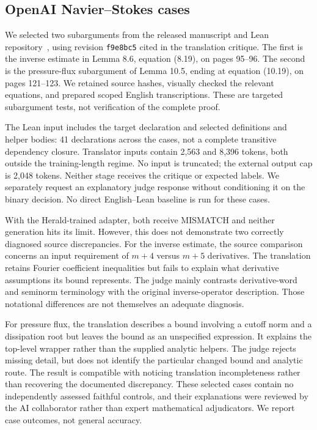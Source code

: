 \documentclass[sigconf,nonacm]{acmart}
\begin{document}
\subsection{OpenAI Navier--Stokes cases}
We selected two subarguments from the released manuscript and Lean repository~\cite{openaiproofs}, using revision \texttt{f9e8bc5} cited in the translation critique. The first is the inverse estimate in Lemma 8.6, equation (8.19), on pages 95--96. The second is the pressure-flux subargument of Lemma 10.5, ending at equation (10.19), on pages 121--123. We retained source hashes, visually checked the relevant equations, and prepared scoped English transcriptions. These are targeted subargument tests, not verification of the complete proof.

The Lean input includes the target declaration and selected definitions and helper bodies: 41 declarations across the cases, not a complete transitive dependency closure. Translator inputs contain 2,563 and 8,396 tokens, both outside the training-length regime. No input is truncated; the external output cap is 2,048 tokens. Neither stage receives the critique or expected labels. We separately request an explanatory judge response without conditioning it on the binary decision. No direct English--Lean baseline is run for these cases.

With the Herald-trained adapter, both receive MISMATCH and neither generation hits its limit. However, this does not demonstrate two correctly diagnosed source discrepancies. For the inverse estimate, the source comparison concerns an input requirement of $m+4$ versus $m+5$ derivatives. The translation retains Fourier coefficient inequalities but fails to explain what derivative assumptions its bound represents. The judge mainly contrasts derivative-word and seminorm terminology with the original inverse-operator description. Those notational differences are not themselves an adequate diagnosis.

For pressure flux, the translation describes a bound involving a cutoff norm and a dissipation root but leaves the bound as an unspecified expression. It explains the top-level wrapper rather than the supplied analytic helpers. The judge rejects missing detail, but does not identify the particular changed bound and analytic route. The result is compatible with noticing translation incompleteness rather than recovering the documented discrepancy. These selected cases contain no independently assessed faithful controls, and their explanations were reviewed by the AI collaborator rather than expert mathematical adjudicators. We report case outcomes, not general accuracy.
\end{document}
